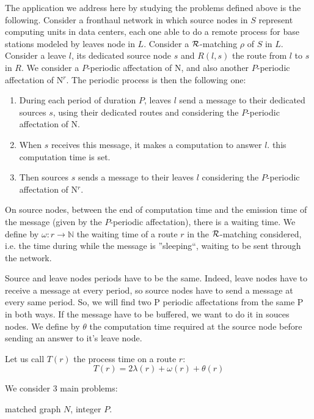 \documentclass{article}
\begin{document}
The application we address here by studying the problems defined above is the following. Consider a fronthaul network in which source nodes in $S$ represent computing units in data centers,
each one able to do a remote process for base stations modeled by leaves node in $L$. Consider a ${\cal R}$-matching $\rho$ of $S$ in $L$. Consider a leave $l$, its dedicated source node $s$
and $R(l,s)$ the route from $l$ to $s$ in $R$. We consider a $P$-periodic affectation of N, and also another $P$-periodic affectation of N$^{r}$.
The periodic process is then the following one:
\begin{enumerate}
 \item During each period of duration $P$, leaves $l$ send a message to their dedicated sources $s$, using their dedicated routes and considering the $P$-periodic affectation of N. 
 \item When $s$ receives this message, it makes a computation to answer $l$. this computation time is set.
 \item Then sources $s$ sends a message to their leaves $l$ considering the $P$-periodic affectation of N$^{r}$.
\end{enumerate}
On source nodes, between the end of computation time and the emission time of the message (given by the $P$-periodic affectation), there is a waiting time. 
We define by $\omega : r \rightarrow \mathbb{N}$ the waiting time of a route $r$ in the ${\cal R}$-matching considered, i.e. the time during while the
message is ''sleeping``, waiting to be sent through the network.


Source and leave nodes periods have to be the same. Indeed, leave nodes have to receive a message at every period, so source nodes have to send a message at every same period.
So, we will find two P periodic affectations from the same P in both ways. 
If the message have to be buffered, we want to do it in souces nodes.
We define by $\theta$ the computation time required at the source node before sending an answer to it's leave node.

Let us call $T (r)$ the process time on a route $r$: $$ T (r) = 2\lambda (r) + \omega (r) + \theta(r)$$


 
 We consider 3 main problems:\\


 matched graph $N$, integer $P$.
\end{document}
